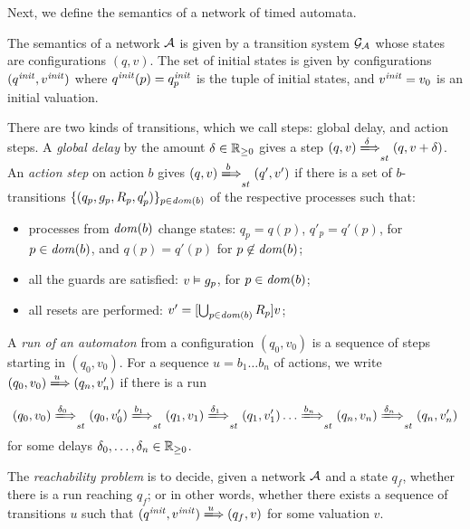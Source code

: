   
  Next, we define the semantics of a network of timed automata. 
  \begin{definition}\label{def:global-run}
      The semantics of a network $\mathcal{A}$ is given by a transition system $\mathcal{G}_{\mathcal{A}}$
      whose states are configurations $(q, v)$. 
      The set of initial states is given by configurations $(q^{\mathit{init}}, v^{\mathit{init}})$ where $q^{\mathit{init}}(p)=q_p^{\mathit{init}}$ is the tuple of initial states, and $v^{\mathit{init}} = v_0$ is an initial valuation.
    
      There are two kinds of
      transitions, which we call steps: global delay, and action steps.  A
      \emph{global delay} by the amount $\delta\in\mathbb{R}_{\ge 0}$ gives a step
      $(q,v)\step{\d}(q,v+\d)$.  An \emph{action step} on action $b$ gives
      $(q,v)\step{b}(q',v')$ if there is a set of $b$-transitions
      $\{(q_p,g_p,R_p,q'_p)\}_{p\in\mathit{dom}(b)}$ of the respective processes
       such that:
      \begin{itemize}
        \item  processes from $\mathit{dom}(b)$ change states: $q_p=q(p)$, $q'_p=q'(p)$, for
        $p\in\mathit{dom}(b)$, and $q(p)=q'(p)$  for $p\not\in\mathit{dom}(b)$; 
        \item all the guards are satisfied: $v\vDash g_p$, for $p\in\mathit{dom}(b)$;
        \item all resets are performed: $v'=[\bigcup_{p\in\mathit{dom}(b)} R_p]v$;
      \end{itemize}
    \end{definition}
    
    A \emph{run of an automaton} from a configuration $(q_0,v_0)$ is a
    sequence of steps starting in $(q_0,v_0)$.  For a sequence
    $u=b_1\dots b_n$ of actions, we write $(q_0,v_0)\act{u}(q_n,v_n')$ if
    there is a run
    \begin{equation*}
      (q_0,v_0)\step{\d_0}
      (q_0,v'_0)\step{b_1}
      (q_1,v_1)\step{\d_1}
      (q_1,v'_1)\dots\step{b_n}
      (q_n,v_n)\step{\d_n}
      (q_n,v'_n)
    \end{equation*}
    for some delays $\delta_0,\dots,\delta_n \in \mathbb{R}_{\ge 0}$.
    
    \begin{definition}
      The \emph{reachability problem } is to decide, given a network $\mathcal{A}$
      and a state $q_f$, whether there is a run reaching $q_f$; or in other
      words, whether there exists a sequence of transitions $u$ such that $(q^\init,v^\init) \act{u} (q_f,v)$ for some valuation $v$.
    \end{definition}

